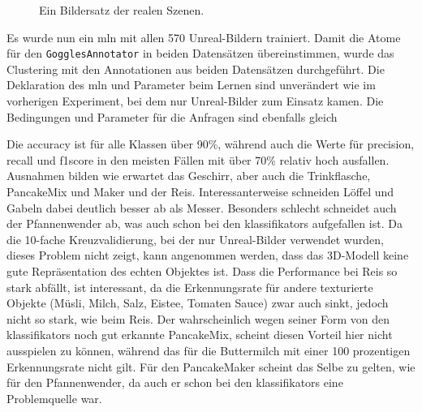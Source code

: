 \begin{figure}
\begin{subfigure}[b]{0.3\textwidth}
	\end{subfigure}
\caption[Reale Bilder einer Szene]{Ein Bildersatz der realen Szenen.}
\label{fig:exampleSceneReal}
\end{figure}

Es wurde nun ein \gls{mln} mit allen 570 Unreal-Bildern trainiert. Damit die Atome für den \texttt{GogglesAnnotator} in beiden Datensätzen übereinstimmen, wurde das Clustering mit den Annotationen aus beiden Datensätzen durchgeführt. Die Deklaration des \gls{mln} und Parameter beim Lernen sind unverändert wie im vorherigen Experiment, bei dem nur Unreal-Bilder zum Einsatz kamen. Die Bedingungen und Parameter für die Anfragen sind ebenfalls gleich \par

Die \gls{accuracy} ist für alle Klassen über 90\%, während auch die Werte für \gls{precision}, \gls{recall} und \gls{f1score} in den meisten Fällen mit über 70\% relativ hoch ausfallen. Ausnahmen bilden wie erwartet das Geschirr, aber auch die Trinkflasche, PancakeMix und Maker und der Reis. Interessanterweise schneiden Löffel und Gabeln dabei deutlich besser ab als Messer. Besonders schlecht schneidet auch der Pfannenwender ab, was auch schon bei den \glspl{klassifikator} aufgefallen ist. Da die 10-fache Kreuzvalidierung, bei der nur Unreal-Bilder verwendet wurden, dieses Problem nicht zeigt, kann angenommen werden, dass das 3D-Modell keine gute Repräsentation des echten Objektes ist. Dass die Performance bei Reis so stark abfällt, ist interessant, da die Erkennungsrate für andere texturierte Objekte (Müsli, Milch, Salz, Eistee, Tomaten Sauce) zwar auch sinkt, jedoch nicht so stark, wie beim Reis. Der wahrscheinlich wegen seiner Form von den \glspl{klassifikator} noch gut erkannte PancakeMix, scheint diesen Vorteil hier nicht ausspielen zu können, während das für die Buttermilch mit einer 100 prozentigen Erkennungsrate nicht gilt. Für den PancakeMaker scheint das Selbe zu gelten, wie für den Pfannenwender, da auch er schon bei den \glspl{klassifikator} eine Problemquelle war. 

